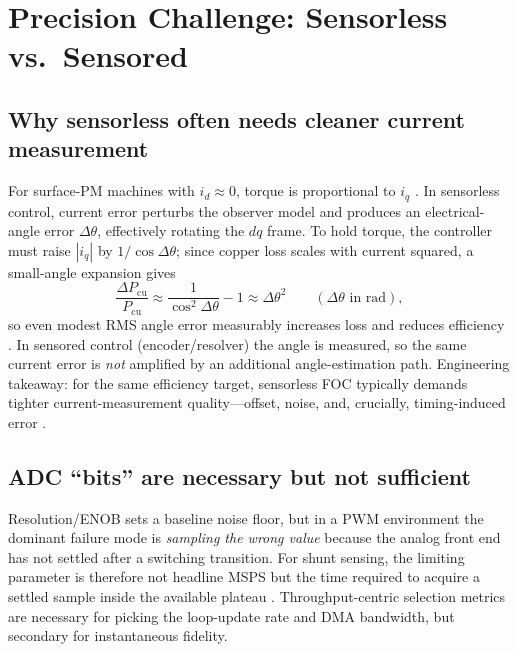 \documentclass[conference]{IEEEtran}
\begin{document}
\section{Precision Challenge: Sensorless vs.\ Sensored}
\subsection{Why sensorless often needs cleaner current measurement}
For surface-PM machines with $i_d\!\approx\!0$, torque is proportional to $i_q$ \cite{Krause2013}. In sensorless control, current error perturbs the observer model and produces an electrical-angle error $\Delta\theta$, effectively rotating the $dq$ frame. To hold torque, the controller must raise $|i_q|$ by $1/\cos\Delta\theta$; since copper loss scales with current squared, a small-angle expansion gives
\begin{equation}
\frac{\Delta P_{\mathrm{cu}}}{P_{\mathrm{cu}}} \approx \frac{1}{\cos^2\Delta\theta}-1 \approx \Delta\theta^2 \qquad (\Delta\theta \text{ in rad}),
\label{eq:cu_loss}
\end{equation}
so even modest RMS angle error measurably increases loss and reduces efficiency \cite{Holtz2002,Vas1998}. In sensored control (encoder/resolver) the angle is measured, so the same current error is \emph{not} amplified by an additional angle-estimation path. Engineering takeaway: for the same efficiency target, sensorless FOC typically demands tighter current-measurement quality---offset, noise, and, crucially, timing-induced error \cite{kofler_sensorless_2025}.

\subsection{ADC ``bits'' are necessary but not sufficient}
Resolution/ENOB sets a baseline noise floor, but in a PWM environment the dominant failure mode is \emph{sampling the wrong value} because the analog front end has not settled after a switching transition. For shunt sensing, the limiting parameter is therefore not headline MSPS but the time required to acquire a settled sample inside the available plateau \cite{Kester2005}. Throughput-centric selection metrics \cite{ADI_EE365_2013,NXP_AN4608_2012,MathWorks_MCB_Sampling_2025,TI_SLAAE96A_2023,ST_AN3116_2010,Microchip_AN1078_2010} are necessary for picking the loop-update rate and DMA bandwidth, but secondary for instantaneous fidelity.

\end{document}
